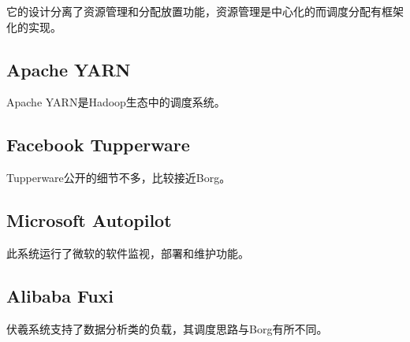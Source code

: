 它的设计分离了资源管理和分配放置功能，资源管理是中心化的而调度分配有框架化的实现。

\subsection{Apache YARN}

Apache YARN是Hadoop生态中的调度系统。

\subsection{Facebook Tupperware}

Tupperware公开的细节不多，比较接近Borg。

\subsection{Microsoft Autopilot}

此系统运行了微软的软件监视，部署和维护功能。

\subsection{Alibaba Fuxi}

伏羲系统支持了数据分析类的负载，其调度思路与Borg有所不同。 
